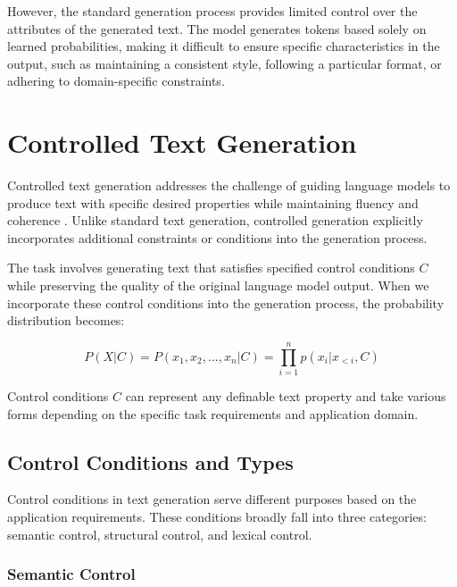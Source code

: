 However, the standard generation process provides limited control over the attributes of the generated text. The model generates tokens based solely on learned probabilities, making it difficult to ensure specific characteristics in the output, such as maintaining a consistent style, following a particular format, or adhering to domain-specific constraints.

\section{Controlled Text Generation}
\label{c2:s:controlled-text-generation}

Controlled text generation addresses the challenge of guiding language models to produce text with specific desired properties while maintaining fluency and coherence \cite{liang2024controllabletextgenerationlarge, 10.1145/3617680, keskar2019ctrlconditionaltransformerlanguage, dathathri2020plugplaylanguagemodels}. Unlike standard text generation, controlled generation explicitly incorporates additional constraints or conditions into the generation process.

The task involves generating text that satisfies specified control conditions $C$ while preserving the quality of the original language model output. When we incorporate these control conditions into the generation process, the probability distribution becomes:

\begin{equation}
    P(X|C) = P(x_1, x_2, ..., x_n|C) = \prod_{i=1}^n p(x_i|x_{<i}, C)
\end{equation}

Control conditions $C$ can represent any definable text property and take various forms depending on the specific task requirements and application domain.

\subsection{Control Conditions and Types}

Control conditions in text generation serve different purposes based on the application requirements. These conditions broadly fall into three categories: semantic control, structural control, and lexical control.

\subsubsection{Semantic Control}

